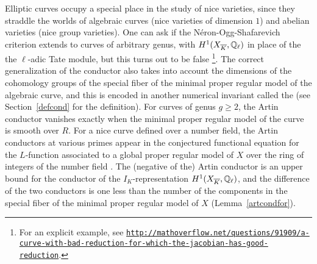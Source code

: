 Elliptic curves occupy a special place in the study of nice varieties, since they straddle the worlds of algebraic curves (nice varieties of dimension $1$) and abelian varieties (nice group varieties). One can ask if the N\'{e}ron-Ogg-Shafarevich criterion extends to curves of arbitrary genus, with $H^1(X_{\overline{K}},\mathbb Q_{\ell})$ in place of the the $\ell$-adic Tate module, but this turns out to be false \cite[Theorem~3.2]{oda} {\footnote{For an explicit example, see {\tt{\url{http://mathoverflow.net/questions/91909/a-curve-with-bad-reduction-for-which-the-jacobian-has-good-reduction}}}.}}.
The correct generalization of the conductor also takes into account the dimensions of the cohomology groups of the special fiber of the minimal proper regular model of the algebraic curve, and this is encoded in another numerical invariant called the {} (see Section~\ref{defcond} for the definition). For curves of genus $g \geq 2$, the Artin conductor vanishes exactly when the minimal proper regular model of the curve is smooth over $R$. For a nice curve defined over a number field, the Artin conductors at various primes appear in the conjectured functional equation for the $L$-function associated to a global proper regular model of $X$ over the ring of integers of the number field \cite[Proposition 1.1]{bloch}. The (negative of the) Artin conductor is an upper bound for the conductor of the $I_K$-representation $H^1(X_{\overline{K}},\mathbb Q_{\ell})$, and the difference of the two conductors is one less than the number of the components in the special fiber of the minimal proper regular model of $X$ (Lemma~\ref{artcondfor}).

